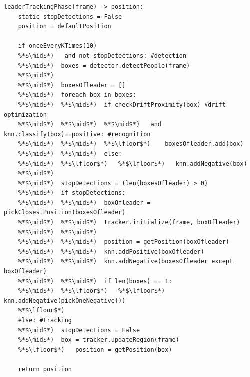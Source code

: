 \begin{lstlisting}[captionpos=b, 
	caption={It is the pseudocode of the second phase. The function \textit{leader tracking} runs alternatively the detection and tracking modules to constantly know the position of the leader.}, 
	label=alg:leaderTrackingPhase
	]
leaderTrackingPhase(frame) -> position:
	static stopDetections = False
	position = defaultPosition
	
	if onceEveryKTimes(10) 
	%*$\mid$*)   and not stopDetections: #detection
	%*$\mid$*)	boxes = detector.detectPeople(frame)
	%*$\mid$*)	
	%*$\mid$*)	boxesOfleader = []
	%*$\mid$*)	foreach box in boxes:
	%*$\mid$*)	%*$\mid$*)	if checkDriftProximity(box) #drift optimization
	%*$\mid$*)	%*$\mid$*)	%*$\mid$*)   and knn.classify(box)==positive: #recognition
	%*$\mid$*)	%*$\mid$*)	%*$\lfloor$*)	 boxesOfleader.add(box)
	%*$\mid$*)	%*$\mid$*)	else:
	%*$\mid$*)	%*$\lfloor$*)	%*$\lfloor$*)	knn.addNegative(box)
	%*$\mid$*)			
	%*$\mid$*)	stopDetections = (len(boxesOfleader) > 0)
	%*$\mid$*)	if stopDetections:
	%*$\mid$*)	%*$\mid$*)	boxOfleader = pickClosestPosition(boxesOfleader) 
	%*$\mid$*)	%*$\mid$*)	tracker.initialize(frame, boxOfleader)
	%*$\mid$*)	%*$\mid$*)	
	%*$\mid$*)	%*$\mid$*)	position = getPosition(boxOfleader)
	%*$\mid$*)	%*$\mid$*)	knn.addPositive(boxOfleader)			 
	%*$\mid$*)	%*$\mid$*)	knn.addNegative(boxesOfleader except boxOfleader)
	%*$\mid$*)	%*$\mid$*)	if len(boxes) == 1:
	%*$\mid$*)	%*$\lfloor$*)	%*$\lfloor$*)	knn.addNegative(pickOneNegative())
	%*$\lfloor$*)		
	else: #tracking
	%*$\mid$*)	stopDetections = False
	%*$\mid$*)	box = tracker.updateRegion(frame)
	%*$\lfloor$*)	position = getPosition(box)
	
	return position
\end{lstlisting}
